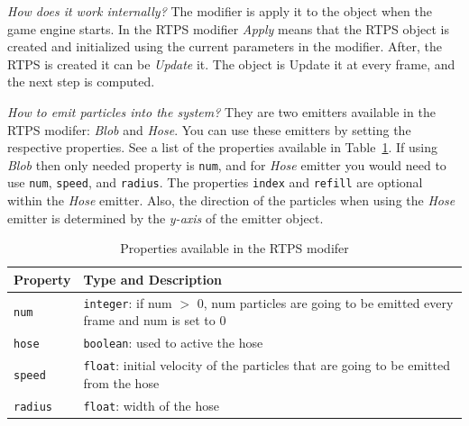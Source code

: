 \textit{How does it work internally?} The modifier is apply it to the object when the game engine starts. In the RTPS modifier \textit{Apply} means that the RTPS object is created and initialized using the current parameters in the modifier. After, the RTPS is created it can be \textit{Update} it. The object is Update it at every frame, and the next step is computed.    

\textit{How to emit particles into the system?} They are two emitters available in the RTPS modifer: \textit{Blob} and \textit{Hose}. You can use these emitters by setting the respective properties. See a list of the properties available in Table~\ref{properties}. If using \textit{Blob} then only needed property is \texttt{num}, and for \textit{Hose} emitter you would need to use \texttt{num}, \texttt{speed}, and \texttt{radius}. The properties \texttt{index} and \texttt{refill} are optional within the \textit{Hose} emitter. Also, the direction of the particles when using the \textit{Hose} emitter is determined by the \textit{y-axis} of the emitter object. 

\begin{table}[htdp]
\caption{Properties available in the RTPS modifer}
\begin{center}
\begin{tabular}{|p{3cm}|p{9cm}|}
\hline 
\textbf{Property} & \textbf{Type and Description} \\\hline 
\texttt{num} 	& \texttt{integer}: if num $>$ 0, num particles are going to be emitted every frame and num is set to 0	\\\hline 
\texttt{hose}	& \texttt{boolean}: used to active the hose	\\\hline
\texttt{speed}	& \texttt{float}: initial velocity of the particles that are going to be emitted from the hose	\\\hline
\texttt{radius}	& \texttt{float}: width of the hose	\\ %
\hline 
\end{tabular}
\end{center}
\label{properties}
\end{table}


